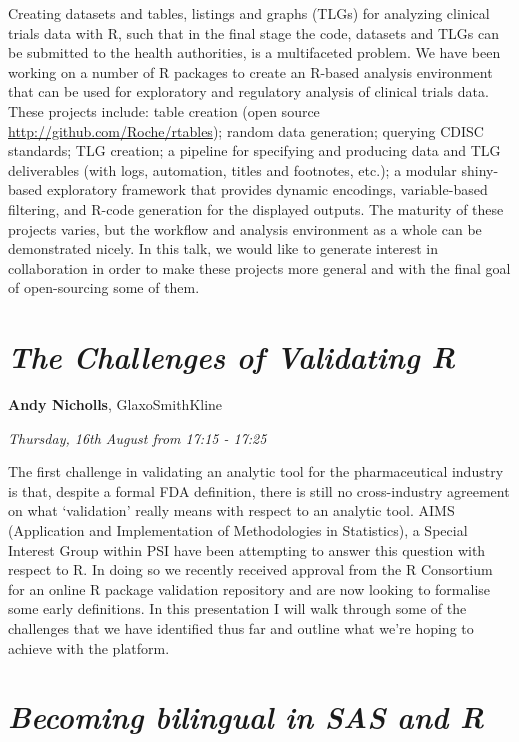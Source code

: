 \documentclass[]{book}
\theoremstyle{definition}
\theoremstyle{definition}
\theoremstyle{definition}
\theoremstyle{remark}
\begin{document}
Creating datasets and tables, listings and graphs (TLGs) for analyzing
clinical trials data with R, such that in the final stage the code,
datasets and TLGs can be submitted to the health authorities, is a
multifaceted problem. We have been working on a number of R packages to
create an R-based analysis environment that can be used for exploratory
and regulatory analysis of clinical trials data. These projects include:
table creation (open source \url{http://github.com/Roche/rtables});
random data generation; querying CDISC standards; TLG creation; a
pipeline for specifying and producing data and TLG deliverables (with
logs, automation, titles and footnotes, etc.); a modular shiny-based
exploratory framework that provides dynamic encodings, variable-based
filtering, and R-code generation for the displayed outputs. The maturity
of these projects varies, but the workflow and analysis environment as a
whole can be demonstrated nicely. In this talk, we would like to
generate interest in collaboration in order to make these projects more
general and with the final goal of open-sourcing some of them.

\hypertarget{the-challenges-of-validating-r}{%
\section{\texorpdfstring{\emph{The Challenges of Validating
R}}{The Challenges of Validating R}}\label{the-challenges-of-validating-r}}

\textbf{Andy Nicholls}, GlaxoSmithKline

\emph{Thursday, 16th August from 17:15 - 17:25}

The first challenge in validating an analytic tool for the
pharmaceutical industry is that, despite a formal FDA definition, there
is still no cross-industry agreement on what `validation' really means
with respect to an analytic tool. AIMS (Application and Implementation
of Methodologies in Statistics), a Special Interest Group within PSI
have been attempting to answer this question with respect to R. In doing
so we recently received approval from the R Consortium for an online R
package validation repository and are now looking to formalise some
early definitions. In this presentation I will walk through some of the
challenges that we have identified thus far and outline what we're
hoping to achieve with the platform.

\hypertarget{becoming-bilingual-in-sas-and-r}{%
\section{\texorpdfstring{\emph{Becoming bilingual in SAS and
R}}{Becoming bilingual in SAS and R}}\label{becoming-bilingual-in-sas-and-r}}
\end{document}
